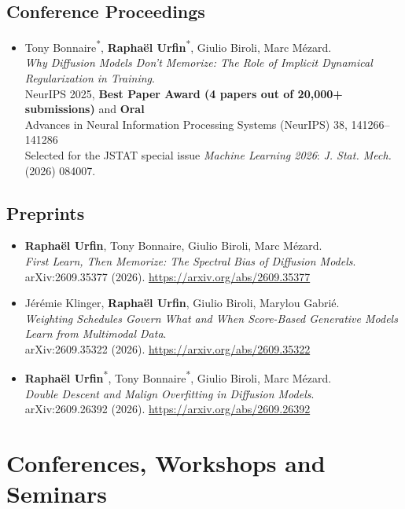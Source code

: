 \documentclass[11pt,a4paper,sans]{moderncv}        %
\begin{document}
\subsection{Conference Proceedings}
\begin{itemize}
\item{Tony Bonnaire\textsuperscript{*}, \textbf{Raphaël Urfin}\textsuperscript{*}, Giulio Biroli, Marc Mézard.\\
\textit{Why Diffusion Models Don't Memorize: The Role of Implicit Dynamical Regularization in Training}.\\
NeurIPS 2025, \textbf{Best Paper Award (4 papers out of 20,000+ submissions)} and \textbf{Oral}\\
Advances in Neural Information Processing Systems (NeurIPS) 38, 141266--141286\\
Selected for the JSTAT special issue \textit{Machine Learning 2026}: \textit{J. Stat. Mech.} (2026) 084007.
}
\end{itemize}

\subsection{Preprints}
\begin{itemize}
\item{\textbf{Raphaël Urfin}, Tony Bonnaire, Giulio Biroli, Marc Mézard.\\
\textit{First Learn, Then Memorize: The Spectral Bias of Diffusion Models}.\\
arXiv:2609.35377 (2026). \href{https://arxiv.org/abs/2609.35377}{https://arxiv.org/abs/2609.35377}
}
\item{Jérémie Klinger, \textbf{Raphaël Urfin}, Giulio Biroli, Marylou Gabrié.\\
\textit{Weighting Schedules Govern What and When Score-Based Generative Models Learn from Multimodal Data}.\\
arXiv:2609.35322 (2026). \href{https://arxiv.org/abs/2609.35322}{https://arxiv.org/abs/2609.35322}
}
\item{\textbf{Raphaël Urfin}\textsuperscript{*}, Tony Bonnaire\textsuperscript{*}, Giulio Biroli, Marc Mézard.\\
\textit{Double Descent and Malign Overfitting in Diffusion Models}.\\
arXiv:2609.26392 (2026). \href{https://arxiv.org/abs/2609.26392}{https://arxiv.org/abs/2609.26392}
}
\end{itemize}


\section{Conferences, Workshops and Seminars}
\end{document}
